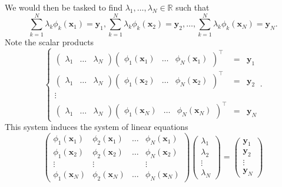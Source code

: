 \documentclass[12pt]{report} %
\newcommand{\tmmathbf}[1]{\ensuremath{\boldsymbol{#1}}}
\begin{document}
We would then be tasked to find $\lambda_1, \ldots, \lambda_N \in \mathbb{R}$
such that
\[ \sum_{k = 1}^N \lambda_k \phi_k (\tmmathbf{x}_1) =\tmmathbf{y}_1, \sum_{k =
   1}^N \lambda_k \phi_k (\tmmathbf{x}_2) =\tmmathbf{y}_2, \ldots, \sum_{k =
   1}^N \lambda_k \phi_k (\tmmathbf{x}_N) =\tmmathbf{y}_N . \]
Note the scalar products
\[ \left\{\begin{array}{cll}
     \left(\begin{array}{ccc}
       \lambda_1 & \ldots & \lambda_N
     \end{array}\right) \left(\begin{array}{ccc}
       \phi_1 (\tmmathbf{x}_1) & \ldots & \phi_N (\tmmathbf{x}_1)
     \end{array}\right)^{\top} & = & \tmmathbf{y}_1\\
     \left(\begin{array}{ccc}
       \lambda_1 & \ldots & \lambda_N
     \end{array}\right) \left(\begin{array}{ccc}
       \phi_1 (\tmmathbf{x}_2) & \ldots & \phi_N (\tmmathbf{x}_2)
     \end{array}\right)^{\top} & = & \tmmathbf{y}_2\\
     \vdots &  & \\
     \left(\begin{array}{ccc}
       \lambda_1 & \ldots & \lambda_N
     \end{array}\right) \left(\begin{array}{ccc}
       \phi_1 (\tmmathbf{x}_N) & \ldots & \phi_N (\tmmathbf{x}_N)
     \end{array}\right)^{\top} & = & \tmmathbf{y}_N
   \end{array}\right. . \]
This system induces the system of linear equations
\begin{equation}
  \left(\begin{array}{cccc}
    \phi_1 (\tmmathbf{x}_1) & \phi_2 (\tmmathbf{x}_1) & \ldots & \phi_N
    (\tmmathbf{x}_1)\\
    \phi_1 (\tmmathbf{x}_2) & \phi_2 (\tmmathbf{x}_2) & \ldots & \phi_N
    (\tmmathbf{x}_2)\\
    \vdots & \vdots &  & \vdots\\
    \phi_1 (\tmmathbf{x}_N) & \phi_2 (\tmmathbf{x}_N) & \ldots & \phi_N
    (\tmmathbf{x}_N)
  \end{array}\right) \left(\begin{array}{c}
    \lambda_1\\
    \lambda_2\\
    \vdots\\
    \lambda_N
  \end{array}\right) = \left(\begin{array}{c}
    \tmmathbf{y}_1\\
    \tmmathbf{y}_2\\
    \vdots\\
    \tmmathbf{y}_N
  \end{array}\right) \label{linear-system-equations-generalized-poly}
\end{equation}
\end{document}
